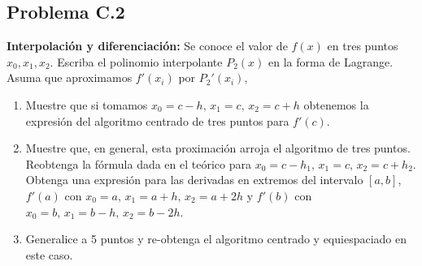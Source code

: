 \documentclass[11pt]{article}
\providecommand{\tightlist}{%
      \setlength{\itemsep}{0pt}\setlength{\parskip}{0pt}}
\begin{document}
    \hypertarget{problema-c.2}{%
\subsection*{Problema C.2}\label{problema-c.2}}

\textbf{Interpolación y diferenciación:} Se conoce el valor de \(f(x)\)
en tres puntos \(x_0,x_1,x_2\). Escriba el polinomio interpolante
\(P_2(x)\) en la forma de Lagrange. Asuma que aproximamos \(f'(x_i)\)
por \(P_2'(x_i)\),

\begin{enumerate}
\def\labelenumi{\arabic{enumi}.}
\tightlist
\item
  Muestre que si tomamos \(x_0=c-h,\,x_1=c,\,x_2=c+h\) obtenemos la
  expresión del algoritmo centrado de tres puntos para \(f'(c)\).
\item
  Muestre que, en general, esta proximación arroja el algoritmo de tres
  puntos. Reobtenga la fórmula dada en el teórico para
  \(x_0=c-h_1,\,x_1=c,\,x_2=c+h_2\). Obtenga una expresión para las
  derivadas en extremos del intervalo \([a,b]\), \(f'(a)\) con
  \(x_0=a,\,x_1=a+h,\,x_2=a+2 h\) y \(f'(b)\) con
  \(x_0=b,\,x_1=b-h,\,x_2=b-2h\).
\item
  Generalice a 5 puntos y re-obtenga el algoritmo centrado y
  equiespaciado en este caso.
\end{enumerate}


    
    
    
    
\end{document}
